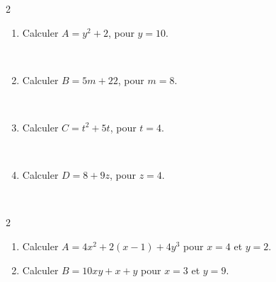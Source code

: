 \documentclass[11pt]{article}
\begin{document}
\begin{exercicedevoir}
  \begin{multicols}{2}
    \begin{enumerate}[itemsep=1em]
    \item \begin{minipage}[t]{\linewidth} Calculer $A = y^2 + 2$, pour $y = 10$. \end{minipage}  \\ \vspace{0.75cm} \encart{4cm} 
    \item \begin{minipage}[t]{\linewidth} Calculer $B = 5m + 22$, pour $m = 8$. \end{minipage}  \\ \vspace{0.75cm} \encart{4cm} 
    \item \begin{minipage}[t]{\linewidth} Calculer $C = t^2 + 5t$, pour $t = 4$. \end{minipage}  \\ \vspace{0.75cm} \encart{4cm} 
    \item \begin{minipage}[t]{\linewidth} Calculer $D = 8 + 9z$, pour $z = 4$. \end{minipage} \\ \vspace{0.75cm} \encart{4cm} 
    \end{enumerate}
  \end{multicols}
\end{exercicedevoir}

\begin{exercicedevoir}
  \begin{multicols}{2}
    \begin{enumerate}[itemsep=1em]
    \item Calculer $A=4x^2+2(x-1)+4y^3$ pour $x=4$ et $y=2$.  \\ \vspace{0.75cm} \encart{6cm} 
    \item Calculer $B=10xy+x+y$ pour $x=3$ et $y=9$.  \\ \vspace{0.75cm} \encart{6.60cm} 
    \end{enumerate}
  \end{multicols}
\end{exercicedevoir}
\end{document}
